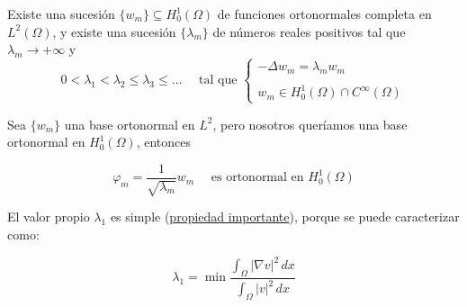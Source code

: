 \documentclass[12pt]{book}
\begin{document}
\begin{teo}
    Existe una sucesión $\{w_m\} \subseteq H_0^1(\Omega)$ de funciones ortonormales completa en $L^2(\Omega)$, y existe una sucesión $\{\lambda_m\}$ de números reales positivos tal que $\lambda_m \longrightarrow +\infty$ y
    \begin{equation*}
        0 < \lambda_1 < \lambda_2 \leq \lambda_3 \leq \dots \quad \text{ tal que } \begin{cases} -\Delta w_m = \lambda_m w_m \\ \\ w_m \in H_0^1(\Omega) \cap C^\infty(\Omega) \end{cases}
    \end{equation*}
\end{teo}

\begin{observacion}
    Sea $\{w_m\}$ una base ortonormal en $L^2$, pero nosotros queríamos una base ortonormal en $H_0^1(\Omega)$, entonces
    
    \begin{equation*}
         \varphi_m = \frac{1}{\sqrt{\lambda_m}} w_m \quad \text{ es ortonormal en } H_0^1(\Omega)
    \end{equation*}
\end{observacion}


\begin{observacion}
    El valor propio $\lambda_1$ es simple (\underline{propiedad importante}), porque se puede caracterizar como:

    $$\lambda_1 = \min \frac{\int_{\Omega} |\nabla v|^2 \, dx}{\int_{\Omega} |v|^2 \, dx}$$
\end{observacion}
\end{document}
